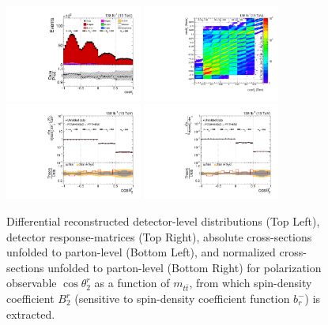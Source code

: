 \clearpage
\begin{figure}[htb]
\begin{center}
 \includegraphics[width=0.40\textwidth]{fig_fullRun2UL/controlplots/combined/Hyp_LeptonBr_vs_TTBarMass.pdf}
 \includegraphics[width=0.40\textwidth]{fig_fullRun2UL/unfolding/combined/ResponseMatrix_b2r_mttbar.pdf} \\
 \includegraphics[width=0.40\textwidth]{fig_fullRun2UL/unfolding/combined/UnfoldedResults_b2r_mttbar.pdf}
 \includegraphics[width=0.40\textwidth]{fig_fullRun2UL/unfolding/combined/UnfoldedResultsNorm_b2r_mttbar.pdf} \\
\label{fig:b2r_mttbar}
\caption{Differential reconstructed detector-level distributions (Top Left), detector response-matrices (Top Right), absolute cross-sections unfolded to parton-level (Bottom Left), and normalized cross-sections unfolded to parton-level (Bottom Right) for polarization observable $\cos\theta_{2}^{r}$ as a function of $m_{t\bar{t}}$, from which spin-density coefficient $B_{2}^{r}$ (sensitive to spin-density coefficient function $b_r^{-}$) is extracted.}
\end{center}
\end{figure}
